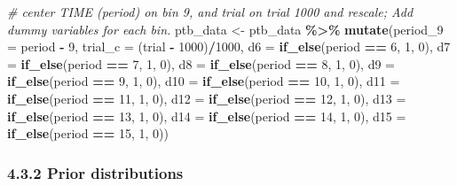 \documentclass[
  man,floatsintext]{apa6}
\newenvironment{Shaded}{\begin{snugshade}}{\end{snugshade}}
\newcommand{\AttributeTok}[1]{\textcolor[rgb]{0.13,0.29,0.53}{#1}}
\newcommand{\CommentTok}[1]{\textcolor[rgb]{0.56,0.35,0.01}{\textit{#1}}}
\newcommand{\DecValTok}[1]{\textcolor[rgb]{0.00,0.00,0.81}{#1}}
\newcommand{\FunctionTok}[1]{\textcolor[rgb]{0.13,0.29,0.53}{\textbf{#1}}}
\newcommand{\NormalTok}[1]{#1}
\newcommand{\OtherTok}[1]{\textcolor[rgb]{0.56,0.35,0.01}{#1}}
\newcommand{\SpecialCharTok}[1]{\textcolor[rgb]{0.81,0.36,0.00}{\textbf{#1}}}
\begin{document}
\begin{Shaded}
\begin{Highlighting}[]
\CommentTok{\# center TIME (period) on bin 9, and trial on trial 1000 and rescale; Add dummy variables for each bin.}
\NormalTok{ptb\_data }\OtherTok{\textless{}{-}}\NormalTok{ ptb\_data }\SpecialCharTok{\%\textgreater{}\%} 
        \FunctionTok{mutate}\NormalTok{(}\AttributeTok{period\_9 =}\NormalTok{ period }\SpecialCharTok{{-}} \DecValTok{9}\NormalTok{,}
               \AttributeTok{trial\_c =}\NormalTok{ (trial }\SpecialCharTok{{-}} \DecValTok{1000}\NormalTok{)}\SpecialCharTok{/}\DecValTok{1000}\NormalTok{,}
               \AttributeTok{d6  =} \FunctionTok{if\_else}\NormalTok{(period }\SpecialCharTok{==} \DecValTok{6}\NormalTok{, }\DecValTok{1}\NormalTok{, }\DecValTok{0}\NormalTok{),}
               \AttributeTok{d7  =} \FunctionTok{if\_else}\NormalTok{(period }\SpecialCharTok{==} \DecValTok{7}\NormalTok{, }\DecValTok{1}\NormalTok{, }\DecValTok{0}\NormalTok{),}
               \AttributeTok{d8  =} \FunctionTok{if\_else}\NormalTok{(period }\SpecialCharTok{==} \DecValTok{8}\NormalTok{, }\DecValTok{1}\NormalTok{, }\DecValTok{0}\NormalTok{),}
               \AttributeTok{d9  =} \FunctionTok{if\_else}\NormalTok{(period }\SpecialCharTok{==} \DecValTok{9}\NormalTok{, }\DecValTok{1}\NormalTok{, }\DecValTok{0}\NormalTok{),}
               \AttributeTok{d10 =} \FunctionTok{if\_else}\NormalTok{(period }\SpecialCharTok{==} \DecValTok{10}\NormalTok{, }\DecValTok{1}\NormalTok{, }\DecValTok{0}\NormalTok{),}
               \AttributeTok{d11 =} \FunctionTok{if\_else}\NormalTok{(period }\SpecialCharTok{==} \DecValTok{11}\NormalTok{, }\DecValTok{1}\NormalTok{, }\DecValTok{0}\NormalTok{),}
               \AttributeTok{d12 =} \FunctionTok{if\_else}\NormalTok{(period }\SpecialCharTok{==} \DecValTok{12}\NormalTok{, }\DecValTok{1}\NormalTok{, }\DecValTok{0}\NormalTok{),}
               \AttributeTok{d13 =} \FunctionTok{if\_else}\NormalTok{(period }\SpecialCharTok{==} \DecValTok{13}\NormalTok{, }\DecValTok{1}\NormalTok{, }\DecValTok{0}\NormalTok{),}
               \AttributeTok{d14 =} \FunctionTok{if\_else}\NormalTok{(period }\SpecialCharTok{==} \DecValTok{14}\NormalTok{, }\DecValTok{1}\NormalTok{, }\DecValTok{0}\NormalTok{),}
               \AttributeTok{d15 =} \FunctionTok{if\_else}\NormalTok{(period }\SpecialCharTok{==} \DecValTok{15}\NormalTok{, }\DecValTok{1}\NormalTok{, }\DecValTok{0}\NormalTok{))}
\end{Highlighting}
\end{Shaded}

\normalsize

\subsubsection{4.3.2 Prior distributions}\label{prior-distributions}
\end{document}
